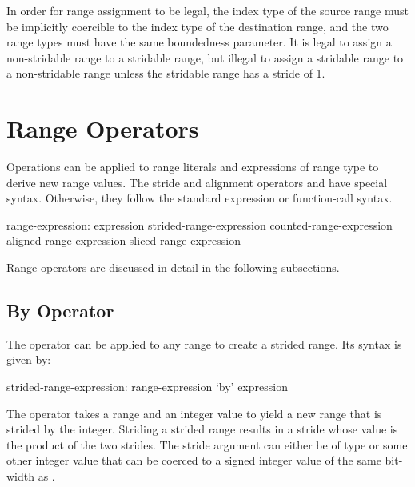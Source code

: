 In order for range assignment to be legal, the index type of the
source range must be implicitly coercible to the index type of the
destination range, and the two range types must have the same boundedness
parameter.  It is legal to assign a non-stridable range to a stridable
range, but illegal to assign a stridable range to a non-stridable
range unless the stridable range has a stride of 1.


\section{Range Operators}
\label{Range_Operators}

Operations can be applied to range literals and expressions of range type to
derive new range values.  The stride and alignment operators 
and  have special syntax.  Otherwise, they follow the standard
expression or function-call syntax.
\begin{syntax}
range-expression:
  expression
  strided-range-expression
  counted-range-expression
  aligned-range-expression
  sliced-range-expression
\end{syntax}

Range operators are discussed in detail in the following subsections.

\subsection{By Operator}
\label{By_Operator_For_Ranges}

The  operator can be applied to any range to create a strided
range.  Its syntax is given by:
\begin{syntax}
strided-range-expression:
  range-expression `by' expression
\end{syntax}

The  operator takes a range and an integer value to yield a
new range that is strided by the integer.  Striding a strided range
results in a stride whose value is the product of the two strides.
The stride argument can either be of type  or some other
integer value that can be coerced to a signed integer value of the same
bit-width as .  

